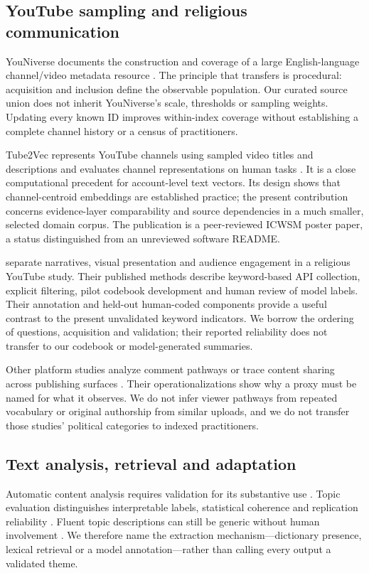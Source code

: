 \subsection{YouTube sampling and religious communication}
YouNiverse documents the construction and coverage of a large English-language channel/video metadata resource \citep{ribeiro2021youniverse}. The principle that transfers is procedural: acquisition and inclusion define the observable population. Our curated source union does not inherit YouNiverse's scale, thresholds or sampling weights. Updating every known ID improves within-index coverage without establishing a complete channel history or a census of practitioners.

Tube2Vec represents YouTube channels using sampled video titles and descriptions and evaluates channel representations on human tasks \citep{boesinger2024tube2vec}. It is a close computational precedent for account-level text vectors. Its design shows that channel-centroid embeddings are established practice; the present contribution concerns evidence-layer comparability and source dependencies in a much smaller, selected domain corpus. The publication is a peer-reviewed ICWSM poster paper, a status distinguished from an unreviewed software README.

\citet{chen2026digital} separate narratives, visual presentation and audience engagement in a religious YouTube study. Their published methods describe keyword-based API collection, explicit filtering, pilot codebook development and human review of model labels. Their annotation and held-out human-coded components provide a useful contrast to the present unvalidated keyword indicators. We borrow the ordering of questions, acquisition and validation; their reported reliability does not transfer to our codebook or model-generated summaries.

Other platform studies analyze comment pathways or trace content sharing across publishing surfaces \citep{ota2025pathways,starbird2018ecosystem}. Their operationalizations show why a proxy must be named for what it observes. We do not infer viewer pathways from repeated vocabulary or original authorship from similar uploads, and we do not transfer those studies' political categories to indexed practitioners.

\subsection{Text analysis, retrieval and adaptation}
Automatic content analysis requires validation for its substantive use \citep{grimmer2013text}. Topic evaluation distinguishes interpretable labels, statistical coherence and replication reliability \citep{chang2009reading,doogan2021twaddle,hoyle2021incoherence,schroeder2025reliability}. Fluent topic descriptions can still be generic without human involvement \citep{li2025haystack}. We therefore name the extraction mechanism---dictionary presence, lexical retrieval or a model annotation---rather than calling every output a validated theme.

